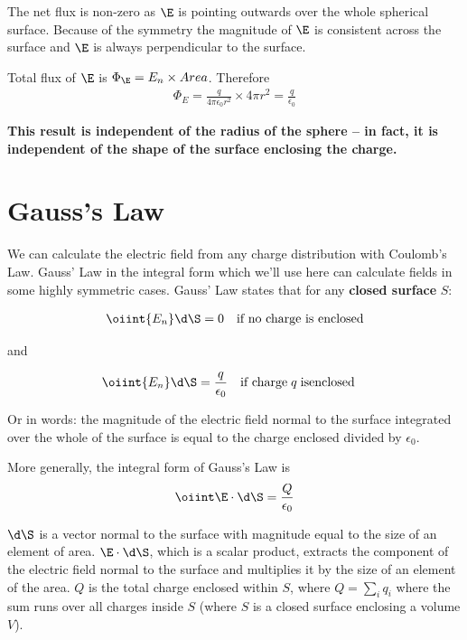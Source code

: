 \documentclass[
]{book}
\begin{document}
The net flux is non-zero as \(\E\) is pointing outwards over the whole
spherical surface. Because of the symmetry the magnitude of \(\E\) is
consistent across the surface and \(\E\) is always perpendicular to the
surface.

Total flux of \(\E\) is \(\Phi_{\E} = E_n \times Area\). Therefore
\[\begin{aligned}
\Phi_E = \frac{q}{4\pi\epsilon_0 r^2} \times 4\pi r^2 = \frac{q}{\epsilon_0} 
\end{aligned}\]

\textbf{This result is independent of the radius of the sphere -- in fact, it
is independent of the shape of the surface enclosing the charge.}

\hypertarget{gausss-law}{%
\section{Gauss's Law}\label{gausss-law}}

We can calculate the electric field from any charge distribution with
Coulomb's Law. Gauss' Law in the integral form which we'll use here can
calculate fields in some highly symmetric cases. Gauss' Law states that
for any \textbf{closed surface} \(S\):

\[\begin{aligned}
\oiint{E_n} \d \S = 0   \quad \text{if no charge is enclosed}
\end{aligned}\]

and

\[\begin{aligned}
\oiint{E_n} \d \S &= \frac{q}{\epsilon_0} \quad  \text{if charge} \; q \; \mathrm{is enclosed}
\end{aligned}\]

Or in words: the magnitude of the electric field normal to the surface
integrated over the whole of the surface is equal to the charge enclosed
divided by \(\epsilon_0\).

More generally, the integral form of Gauss's Law is
\[\label{eq:GaussLaw} 
\oiint \E \cdot \d \S =\frac{Q}{\epsilon_0}\]

\(\d \S\) is a vector normal to the surface with magnitude equal to the
size of an element of area. \(\E \cdot \d \S\), which is a scalar product,
extracts the component of the electric field normal to the surface and
multiplies it by the size of an element of the area. \(Q\) is the total
charge enclosed within \(S\), where \(Q = \sum_i q_i\) where the sum runs
over all charges inside \(S\) (where \(S\) is a closed surface enclosing a
volume \(V\)).
\end{document}
